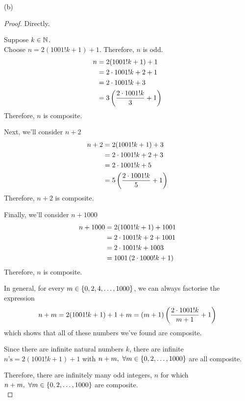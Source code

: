 \documentclass[a4paper,12pt]{report}
\begin{document}
\sol (b)
\begin{proof}
	Directly.
	\begin{list}{}{\setlength{\leftmargin}{1in}\setlength{\topsep}{0pt}}\item
		Suppose $k\in\mathbb{N}$. \\
		Choose $n = 2(1001!k + 1)+1$.
		Therefore, $n$ is odd.
		\begin{align*}
			n &= 2(1001!k + 1) + 1 \\
				&= 2\cdot1001!k + 2 + 1 \\
				&= 2\cdot1001!k + 3 \\
				&= 3\left( \frac{2\cdot1001!k}{3} + 1 \right)
		\end{align*}
		Therefore, $n$ is composite.

		Next, we'll consider $n+2$
		\begin{align*}
			n + 2 &= 2(1001!k + 1) + 3 \\
				&= 2\cdot1001!k + 2 + 3 \\
				&= 2\cdot1001!k + 5 \\
				&= 5\left( \frac{2\cdot1001!k}{5} + 1 \right)
		\end{align*}
		Therefore, $n+2$ is composite.

		Finally, we'll consider $n+1000$
		\begin{align*}
			n + 1000 &= 2(1001!k + 1) + 1001 \\
				&= 2\cdot1001!k + 2 + 1001 \\
				&= 2\cdot1001!k + 1003 \\
				&= 1001\left( 2\cdot1000!k + 1 \right)
		\end{align*}
		Therefore, $n$ is composite.

		In general, for every $m\in\left\lbrace 0,2,4,\dots,1000 \right\rbrace$, we can always factorise the expression
		$$
			n + m = 2(1001!k + 1)+1+m = (m+1)\left( \frac{2\cdot1001!k}{m+1}+1 \right)
		$$
		which shows that all of these numbers we've found are composite. 

		Since there are infinite natural numbers $k$, there are infinite $n\text{'s} = 2(1001!k + 1)+1$ with $n+m,\ \forall m\in\left\lbrace 0,2,\dots,1000 \right\rbrace$ are all composite.\\
	\end{list}
	Therefore, there are infinitely many odd integers, $n$ for which $n+m,\ \forall m\in\left\lbrace 0,2,\dots,1000 \right\rbrace$ are composite.	\\
\end{proof}
\end{document}
